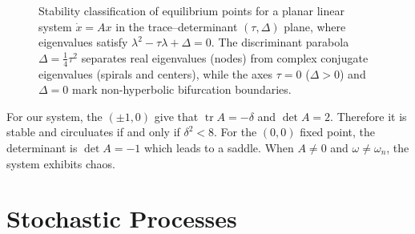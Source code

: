 \documentclass{article}
\theoremstyle{definition}
\begin{document}
\begin{figure}[htbp]
    \caption{Stability classification of equilibrium points for a planar linear system $\dot{x} = Ax$ in the trace--determinant $(\tau, \Delta)$ plane, where eigenvalues satisfy $\lambda^2 - \tau\lambda + \Delta = 0$. The discriminant parabola $\Delta = \frac{1}{4}\tau^2$ separates real eigenvalues (nodes) from complex conjugate eigenvalues (spirals and centers), while the axes $\tau = 0$ ($\Delta > 0$) and $\Delta = 0$ mark non-hyperbolic bifurcation boundaries.}
    \label{fig:trace_det_stability}
\end{figure}
For our system, the $(\pm 1,0)$ give that $\operatorname{tr}A = -\delta$ and $\det A = 2$. Therefore it is stable and circuluates if and only if $\delta ^2 < 8$. For the $(0,0)$ fixed point, the determinant is $\det A = -1$ which leads to a saddle. When $A\neq 0$ and $\omega \neq \omega_n$, the system exhibits chaos.

\section{Stochastic Processes}
\end{document}
